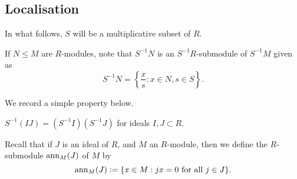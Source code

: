 \subsection{Localisation}

In what follows, $S$ will be a multiplicative subset of $R$.

If $N \le M$ are $R$-modules, note that $S^{-1}N$ is an $S^{-1}R$-submodule of $S^{-1}M$ given as
\begin{equation*} 
	S^{-1}N = \left\{\frac{x}{s} : x \in N, s \in S\right\}.
\end{equation*}

We record a simple property below.

\begin{prop} \label{prop:localisation-product-ideals}
	$S^{-1}(IJ) = (S^{-1} I) (S^{-1}J)$ for ideals $I, J \subset R$.
\end{prop}

Recall that if $J$ is an ideal of $R$, and $M$ an $R$-module, then we define the $R$-submodule $\operatorname{ann}_{M}(J)$ of $M$ by
\begin{equation*} 
	\operatorname{ann}_{M}(J) \vcentcolon= \{x \in M : jx = 0 \text{ for all } j \in J\}.
\end{equation*}

